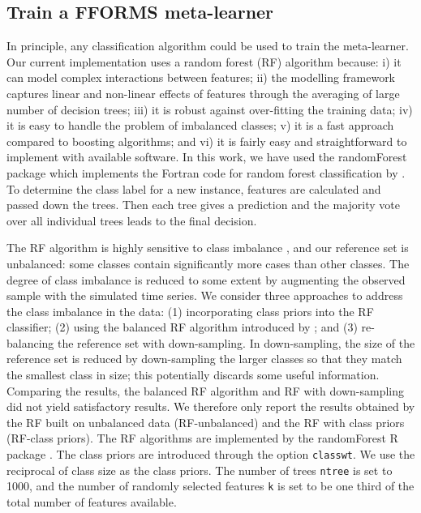 \documentclass[11pt,a4paper,]{article}
\begin{document}
\hypertarget{train-a-fforms-meta-learner}{%
\subsection{Train a FFORMS meta-learner}\label{train-a-fforms-meta-learner}}

In principle, any classification algorithm could be used to train the meta-learner. Our current implementation uses a random forest (RF) algorithm because: i) it can model complex interactions between features; ii) the modelling framework captures linear and non-linear effects of features through the averaging of large number of decision trees; iii) it is robust against over-fitting the training data; iv) it is easy to handle the problem of imbalanced classes; v) it is a fast approach compared to boosting algorithms; and vi) it is fairly easy and straightforward to implement with available software. In this work, we have used the randomForest package \autocite{liaw2002randomforest,rfpkg} which implements the Fortran code for random forest classification by \textcite{breiman2004random}. To determine the class label for a new instance, features are calculated and passed down the trees. Then each tree gives a prediction and the majority vote over all individual trees leads to the final decision.

The RF algorithm is highly sensitive to class imbalance \autocite{breiman2001random}, and our reference set is unbalanced: some classes contain significantly more cases than other classes. The degree of class imbalance is reduced to some extent by augmenting the observed sample with the simulated time series. We consider three approaches to address the class imbalance in the data: (1) incorporating class priors into the RF classifier; (2) using the balanced RF algorithm introduced by \textcite{chen2004using}; and (3) re-balancing the reference set with down-sampling. In down-sampling, the size of the reference set is reduced by down-sampling the larger classes so that they match the smallest class in size; this potentially discards some useful information. Comparing the results, the balanced RF algorithm and RF with down-sampling did not yield satisfactory results. We therefore only report the results obtained by the RF built on unbalanced data (RF-unbalanced) and the RF with class priors (RF-class priors). The RF algorithms are implemented by the randomForest R package \autocite{liaw2002randomforest,rfpkg}. The class priors are introduced through the option \texttt{classwt}. We use the reciprocal of class size as the class priors. The number of trees \texttt{ntree} is set to 1000, and the number of randomly selected features \texttt{k} is set to be one third of the total number of features available.
\end{document}
